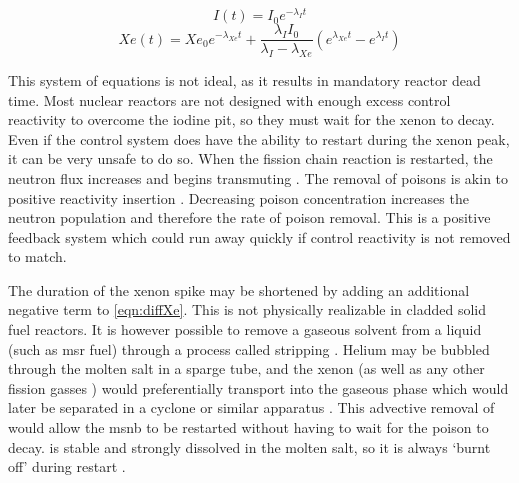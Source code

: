 \begin{equation}\label{eqn:I_inf}
    I(t) = I_0e^{-\lambda_I t}
\end{equation}
\begin{equation}\label{eqn:Xe_inf}
    Xe(t) = Xe_0e^{-\lambda_{Xe} t}+\frac{\lambda_I I_0}{\lambda_I - \lambda_{Xe}}(e^{\lambda_{Xe}t}-e^{\lambda_{I}t})
\end{equation}

This system of equations is not ideal, as it results in mandatory reactor dead time. Most nuclear reactors are not designed with enough excess control reactivity to overcome the iodine pit, so they must wait for the xenon to decay. Even if the control system does have the ability to restart during the xenon peak, it can be very unsafe to do so. When the fission chain reaction is restarted, the neutron flux increases and begins transmuting \Xe. The removal of poisons is akin to positive reactivity insertion \cite{Roberson}. Decreasing poison concentration increases the neutron population and therefore the rate of poison removal. This is a positive feedback system which could run away quickly if control reactivity is not removed to match. 

The duration of the xenon spike may be shortened by adding an additional negative term to \ref{eqn:diffXe}. This is not physically realizable in cladded solid fuel reactors. It is however possible to remove a gaseous solvent from a liquid (such as \acs{msr} fuel) through a process called stripping \cite[Ch. 10]{Geankoplis}. Helium may be bubbled through the molten salt in a sparge tube, and the xenon (as well as any other fission gasses \cite{Offgas}) would preferentially transport into the gaseous phase which would later be separated in a cyclone or similar apparatus \cite{ORNL-masstransport}. This advective removal of \Xe would allow the \acs{msnb} to be restarted without having to wait for the poison to decay. \Sa is stable and strongly dissolved in the molten salt, so it is always `burnt off' during restart \cite[Ch. 7]{Lamarsh}.